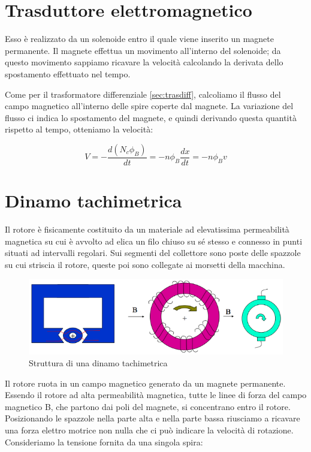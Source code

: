 \section{Trasduttore elettromagnetico}
Esso è realizzato da un solenoide entro il quale viene inserito un
magnete permanente. Il magnete effettua un movimento all'interno del
solenoide; da questo movimento sappiamo ricavare la velocità
calcolando la derivata dello spostamento effettuato nel tempo.


Come per il trasformatore differenziale \ref{sec:trasdiff},
calcoliamo il flusso del campo magnetico all'interno delle spire
coperte dal magnete. La variazione del flusso ci indica lo
spostamento del magnete, e quindi derivando questa quantità rispetto
al tempo, otteniamo la velocità:

	\[V=-\frac{d(N_c\phi_B)}{dt}= -n\phi_B\frac{dx}{dt}
	   =-n\phi_B v\]


\section{Dinamo tachimetrica}
Il rotore è fisicamente costituito da un materiale ad elevatissima
permeabilità magnetica su cui è avvolto ad elica un filo chiuso su sé
stesso e connesso in punti situati ad intervalli regolari.
Sui segmenti del collettore sono poste delle spazzole su cui striscia
il rotore, queste poi sono collegate ai morsetti della macchina.

\begin{figure}[htbp]
	\centering
	\includegraphics[scale=0.5]
			{img/dinamo.png}
	\caption{Struttura di una dinamo tachimetrica
\label{fig:dianmo}}
\end{figure}

Il rotore ruota in un campo magnetico generato da un magnete
permanente. Essendo il rotore ad alta permeabilità magnetica, tutte le
linee di forza del campo magnetico B, che partono dai poli del
magnete, si concentrano entro il rotore. Posizionando le spazzole
nella parte alta e nella parte bassa riusciamo a ricavare una forza
elettro motrice non nulla che ci può indicare la velocità di
rotazione. Consideriamo la tensione fornita da una singola spira:

